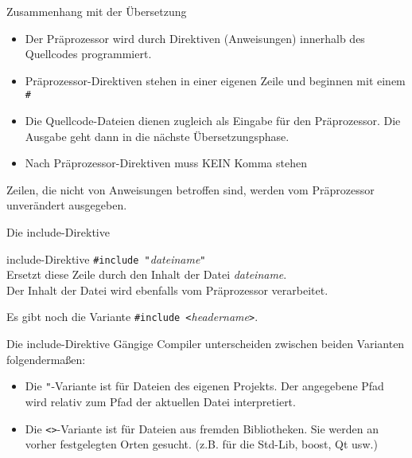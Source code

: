 \begin{frame}[fragile]{Zusammenhang mit der Übersetzung}
	\begin{itemize}
		\item Der Präprozessor wird durch Direktiven (Anweisungen) innerhalb des Quellcodes programmiert.
		\item Präprozessor-Direktiven stehen in einer eigenen Zeile und beginnen mit einem \verb|#|
		\item Die Quellcode-Dateien dienen zugleich als Eingabe für den Präprozessor. Die Ausgabe geht dann in die nächste Übersetzungsphase.
		\item Nach Präprozessor-Direktiven muss KEIN Komma stehen
	\end{itemize}
	
	\pause
	\vspace{1em}
	
 	Zeilen, die nicht von Anweisungen betroffen sind, werden vom Präprozessor unverändert ausgegeben.
\end{frame}

\begin{frame}[fragile]{Die include-Direktive}
	\begin{block}{include-Direktive}
		\verb|#include "|\emph{dateiname}\verb|"| \\
		\vspace{0.5em}
		Ersetzt diese Zeile durch den Inhalt der Datei \emph{dateiname}. \\
		Der Inhalt der Datei wird ebenfalls vom Präprozessor verarbeitet.
	\end{block}
	
	\pause
	\vspace{1em}
	
	\small
	Es gibt noch die Variante \verb|#include <|\emph{headername}\verb|>|.
\end{frame}

\begin{frame}[fragile]{Die include-Direktive}
	Gängige Compiler unterscheiden zwischen beiden Varianten folgendermaßen:
	\begin{itemize}
		\item Die \verb|"|-Variante ist für Dateien des eigenen Projekts.
		      Der angegebene Pfad wird relativ zum Pfad der aktuellen Datei interpretiert.
		\item Die \verb|<>|-Variante ist für Dateien aus fremden Bibliotheken.
		      Sie werden an vorher festgelegten Orten gesucht. (z.B. für die Std-Lib, boost, Qt usw.)
	\end{itemize}
\end{frame}

